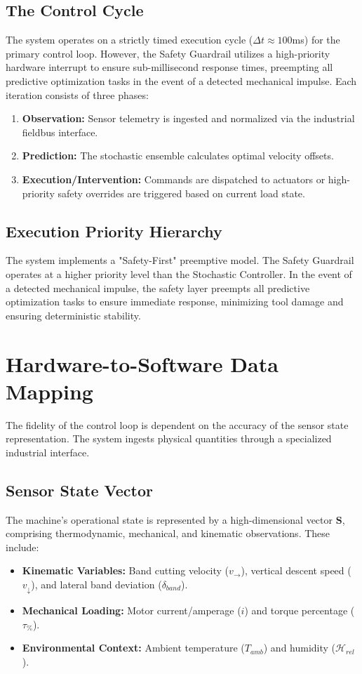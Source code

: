 \documentclass[letterpaper]{article}
\begin{document}
\subsection{The Control Cycle}
The system operates on a strictly timed execution cycle ($\Delta t \approx 100$ms) for the primary control loop. However, the Safety Guardrail utilizes a high-priority hardware interrupt to ensure sub-millisecond response times, preempting all predictive optimization tasks in the event of a detected mechanical impulse. Each iteration consists of three phases:
\begin{enumerate}
    \item \textbf{Observation:} Sensor telemetry is ingested and normalized via the industrial fieldbus interface.
    \item \textbf{Prediction:} The stochastic ensemble calculates optimal velocity offsets.
    \item \textbf{Execution/Intervention:} Commands are dispatched to actuators or high-priority safety overrides are triggered based on current load
state.
\end{enumerate}

\subsection{Execution Priority Hierarchy}
The system implements a "Safety-First" preemptive model. The Safety Guardrail operates at a higher priority level than the Stochastic Controller. In
the event of a detected mechanical impulse, the safety layer preempts all predictive optimization tasks to ensure immediate response, minimizing tool
damage and ensuring deterministic stability.

\section{Hardware-to-Software Data Mapping}
The fidelity of the control loop is dependent on the accuracy of the sensor state representation. The system ingests physical quantities through a
specialized industrial interface.

\subsection{Sensor State Vector}
The machine's operational state is represented by a high-dimensional vector $\mathbf{S}$, comprising thermodynamic, mechanical, and kinematic
observations. These include:
\begin{itemize}
    \item \textbf{Kinematic Variables:} Band cutting velocity ($v_{\rightarrow}$), vertical descent speed ($v_{\downarrow}$), and lateral band
deviation ($\delta_{band}$).
    \item \textbf{Mechanical Loading:} Motor current/amperage ($i$) and torque percentage ($\tau_{\%}$).
    \item \textbf{Environmental Context:} Ambient temperature ($T_{amb}$) and humidity ($\mathcal{H}_{rel}$).
\end{itemize}
\end{document}
